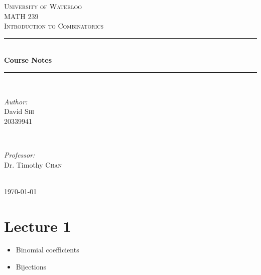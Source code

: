 \documentclass[english,12pt]{article}
\theoremstyle{plain}
\theoremstyle{definition}
\theoremstyle{definition} %
\begin{document}
\begin{titlepage}

\newcommand{\HRule}{\rule{\linewidth}{0.5mm}} %

\center %

\textsc{\LARGE University of Waterloo}\\[1.5cm] %
\textsc{\Large MATH 239}\\[0.5cm] %
\textsc{\large Introduction to Combinatorics}\\[0.5cm] %

\HRule \\[0.4cm]
{ \huge \bfseries Course Notes}\\[0.4cm] %
\HRule \\[1.5cm]

\begin{minipage}{0.4\textwidth}
\begin{flushleft} \large
\emph{Author:}\\
David \textsc{Shi}\\ %
20339941
\end{flushleft}
\end{minipage}
~
\begin{minipage}{0.4\textwidth}
\begin{flushright} \large
\emph{Professor:} \\
Dr. Timothy \textsc{Chan} %
\end{flushright}
\end{minipage}\\[4cm]

{\large \today}\\[3cm] %


\vfill %

\end{titlepage}


\newpage
\section{Lecture 1}
\begin{itemize}
\item Binomial coefficients
\item Bijections
\end{itemize}
\end{document}
